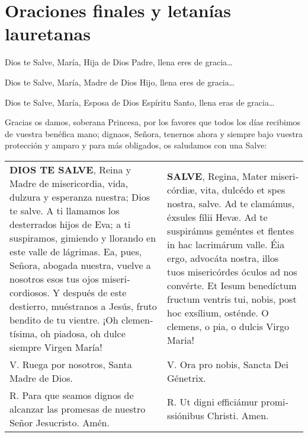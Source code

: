 \documentclass[./rosary.tex]{subfiles}
\begin{document}
\section*{Oraciones finales y letanías lauretanas}
\label{sec:final-prayer}

Dios te Salve, María, Hija de Dios Padre, llena eres de gracia{\ldots}

Dios te Salve, María, Madre de Dios Hijo, llena eres de gracia{\ldots}

Dios te Salve, María, Esposa de Dios Espíritu Santo, llena eras de gracia{\ldots}

\bigskip

Gracias os damos, soberana Princesa, por los favores que todos los días recibimos de vuestra benéfica mano; dignaos, Señora, tenernos ahora
y siempre bajo vuestra protección y amparo y para más obligados, os saludamos con una Salve:

\label{hailMaryQueen}
\begin{longtable} { p{} p{} }
    \textbf{DIOS TE SALVE}, Reina y Madre de mi­se­ri­cordia, vida, dulzura y esperanza nuestra; Dios te salve.
    A ti llamamos los desterrados hijos de Eva; a ti suspiramos, gimiendo y llorando en este valle de lágrimas.
    Ea, pues, Señora, abogada nuestra, vuelve a nosotros esos tus ojos mi­se­ri­cordiosos. Y después de este destierro, muéstranos a Jesús,
    fruto bendito de tu vientre. ¡Oh cle­men­tísima, oh piadosa, oh dulce siempre Virgen María!

                                                                                          &

    \textbf{SALVE}, Regina, Mater mi­se­ri­córdiæ, vita, dulcédo et spes nostra, salve. Ad te clamámus, éxsules fílii Hevæ.
    Ad te suspirámus geméntes et flentes in hac lacrimárum valle. Éia ergo, advocáta nostra, illos tuos mi­se­ri­córdes óculos ad nos convérte.
    Et Iesum benedíctum fructum ventris tui, nobis, post hoc exsílium, osténde. O clemens, o pia, o dulcis Virgo Maria!            \\

    V. Ruega por nosotros, Santa Madre de Dios.                                           & V. Ora pro nobis, Sancta Dei Génetrix. \\

    R. Para que seamos dignos de alcanzar las promesas de nuestro Señor Jesucristo. Amén. &
    R. Ut digni efficiámur pro­mi­ssiónibus Christi. Amen.
\end{longtable}
\end{document}
